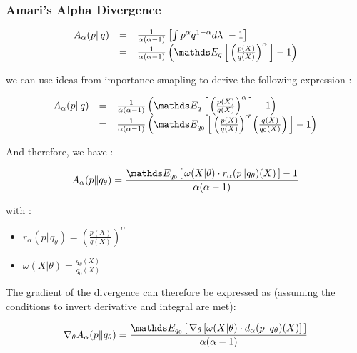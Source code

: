 \subsubsection{Amari's Alpha Divergence}

$$
	\begin{array}{lcl}
		A_\alpha( p \Vert q ) & = & \frac{1}{\alpha( \alpha - 1 )} \left[ \int p^\alpha q^{1 - \alpha} d\lambda \ -1 \right]
		\\
		                      & = & \frac{1}{\alpha( \alpha - 1 )} \left( \esperanceloi q { \left( \frac {p(X)} {q(X)} \right)^\alpha } - 1\right)
	\end{array}
$$

we can use ideas from importance smapling to derive the following expression :


\[
	\begin{array}{lcl}

		A_\alpha( p \Vert q ) & = & \frac{1}{\alpha( \alpha - 1 )} \left( \esperanceloi q { \left( \frac {p(X)} {q(X)} \right)^\alpha } - 1\right)

		\\
		                      & = & \frac{1}{\alpha( \alpha - 1 )} \left( \esperanceloi {q_0} { \left( \frac {p(X)} {q(X)} \right)^\alpha  \left( \frac{q(X)}{q_0(X)} \right) } - 1\right)
		\\
	\end{array}
\]


And therefore, we have :

$$A_\alpha( p \Vert q_\theta ) = \frac {\esperanceloi {q_0} { \omega(X \vert \theta) \cdot r_\alpha(p \Vert q_\theta )(X) } - 1 }{\alpha ( \alpha - 1 )}$$


with :
\begin{itemize}
    \item $r_\alpha( p \Vert q_\theta ) = \left( \frac {p(X)} {q(X)} \right)^\alpha$
    \item $\omega( X \vert \theta ) = \frac{q_\theta(X)}{q_0(X)}$
\end{itemize}

The gradient of the divergence can therefore be expressed as (assuming the conditions to invert derivative and integral are met):

$$
\nabla_\theta A_\alpha( p \Vert q_\theta ) = 
\frac {
\esperanceloi {q_0} { \nabla_\theta 
\left[\omega(X \vert \theta) \cdot d_\alpha(p \Vert q_\theta )(X)\right] } 
}
{\alpha ( \alpha - 1 )}
$$
